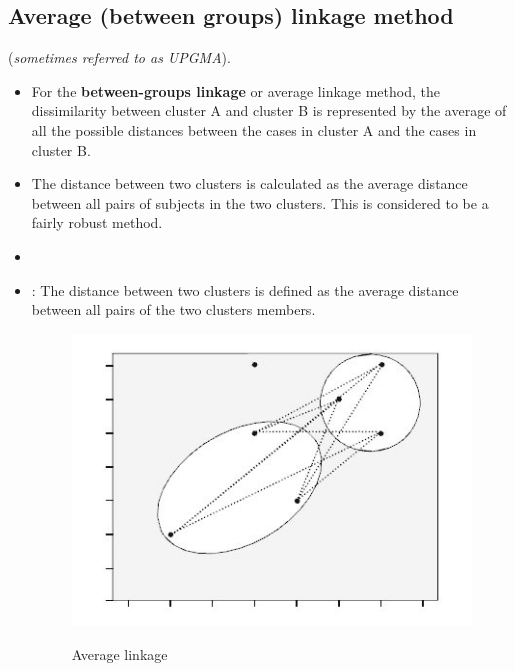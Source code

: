 \documentclass[a4paper,12pt]{article}
\begin{document}
\subsection{Average (between groups) linkage method }
(\textit{sometimes referred to as UPGMA}).\\
\begin{itemize}
\item For the \textbf{between-groups linkage} or average linkage method, the dissimilarity between cluster A and cluster B is represented by the average of all the possible distances between the cases in cluster A and the cases in cluster B. 
\item The distance between two clusters is calculated as the average distance between all pairs
of subjects in the two clusters. This is considered to be a fairly robust method.
\item 
\item : The distance between two clusters is defined as the average
distance between all pairs of the two clusters members.
\begin{figure}[h!]
	\begin{center}
		\includegraphics[scale=0.4]{images/Link3.jpg}\\
		\caption{Average linkage}
	\end{center}
\end{figure}
\end{itemize}
\end{document}
